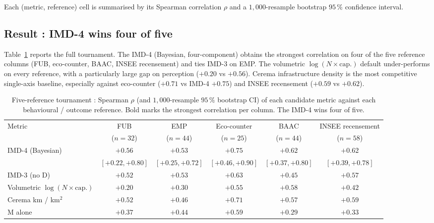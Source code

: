 \documentclass[11pt,a4paper]{article}
\begin{document}
Each (metric, reference) cell is summarised by its Spearman
correlation $\rho$ and a $1{,}000$-resample bootstrap $95\,\%$
confidence interval.

\subsection{Result : IMD-4 wins four of five}

Table~\ref{tab:tournament} reports the full tournament.
The IMD-4 (Bayesian, four-component) obtains the strongest
correlation on four of the five reference columns (FUB,
eco-counter, BAAC, INSEE recensement) and ties IMD-3 on EMP.
The volumetric $\log(N \times \text{cap.})$ default
under-performs on every reference, with a particularly large gap
on perception ($+0.20$ vs $+0.56$).  Cerema infrastructure
density is the most competitive single-axis baseline, especially
against eco-counter ($+0.71$ vs IMD-4 $+0.75$) and INSEE recensement
($+0.59$ vs $+0.62$).

\begin{table}[H]
\centering
\caption{Five-reference tournament : Spearman $\rho$ (and
$1{,}000$-resample $95\,\%$ bootstrap CI) of each candidate metric
against each behavioural / outcome reference.  Bold marks the
strongest correlation per column.  The IMD-4 wins four of five.}
\label{tab:tournament}
\small
\begin{tabular}{@{}lccccc@{}}
\toprule
Metric &
FUB &
EMP &
Eco-counter &
BAAC &
INSEE recensement \\
& ($n=32$) & ($n=44$) & ($n=25$) & ($n=44$) & ($n=58$) \\
\midrule
IMD-4 (Bayesian)         & $\mathbf{+0.56}$ & $\mathbf{+0.53}$ & $\mathbf{+0.75}$ & $\mathbf{+0.62}$ & $\mathbf{+0.62}$ \\
                         & $[+0.22,+0.80]$ & $[+0.25,+0.72]$ & $[+0.46,+0.90]$ & $[+0.37,+0.80]$ & $[+0.39,+0.78]$ \\
IMD-3 (no D)             & $+0.52$ & $\mathbf{+0.53}$ & $+0.63$ & $+0.45$ & $+0.57$ \\
Volumetric $\log(N\!\times\!\text{cap.})$
                         & $+0.20$ & $+0.30$ & $+0.55$ & $+0.58$ & $+0.42$ \\
Cerema km / km$^{2}$     & $+0.52$ & $+0.46$ & $+0.71$ & $+0.57$ & $+0.59$ \\
M alone                  & $+0.37$ & $+0.44$ & $+0.59$ & $+0.29$ & $+0.33$ \\
\bottomrule
\end{tabular}
\end{table}
\end{document}
